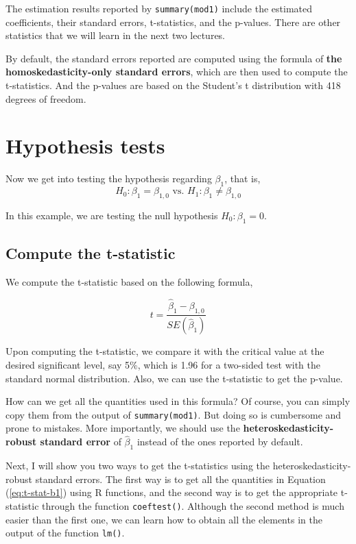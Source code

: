 \documentclass[11pt]{article}
\begin{document}
The estimation results reported by \texttt{summary(mod1)} include the
estimated coefficients, their standard errors, t-statistics, and the
p-values. There are other statistics that we will learn in the next
two lectures.

By default, the standard errors reported are computed using
the formula of \textbf{the homoskedasticity-only standard errors}, which are
then used to compute the t-statistics. And the p-values are based on
the Student's t distribution with 418 degrees of freedom.


\section{Hypothesis tests}
\label{sec:orgbf56b7b}

Now we get into testing the hypothesis regarding \(\beta_1\), that is,
\[ H_0: \beta_1 = \beta_{1,0} \text{ vs. } H_1: \beta_1 \neq
\beta_{1,0} \]

In this example, we are testing the null hypothesis \(H_0: \beta_1 =
0\).

\subsection*{Compute the t-statistic}
\label{sec:org80a95a5}

We compute the t-statistic based on the
following formula,

\begin{equation}
\label{eq:t-stat-b1}
t = \frac{\hat{\beta}_1 - \beta_{1,0}}{SE(\hat{\beta}_1)}
\end{equation}

Upon computing the t-statistic, we compare it with the critical value
at the desired significant level, say 5\%, which is 1.96 for a
two-sided test with the standard normal distribution. Also, we can use
the t-statistic to get the p-value.

How can we get all the quantities used in this formula? Of course, you
can simply copy them from the output of \texttt{summary(mod1)}. But doing so
is cumbersome and prone to mistakes. More importantly, we should use
the \textbf{heteroskedasticity-robust standard error} of \(\hat{\beta}_1\)
instead of the ones reported by default.

Next, I will show you two ways to get the t-statistics using the
heteroskedasticity-robust standard errors. The first way is to get all
the quantities in Equation (\ref{eq:t-stat-b1}) using R
functions, and the second way is to get the appropriate t-statistic
through the function \texttt{coeftest()}. Although the second method is much
easier than the first one, we can learn how to obtain all the elements
in the output of the function \texttt{lm()}.
\end{document}
